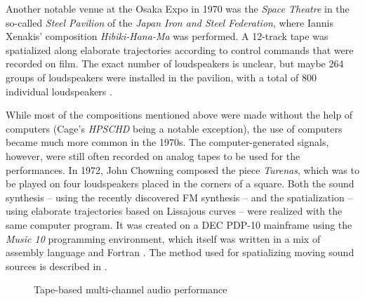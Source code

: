 Another notable venue at the Osaka Expo in 1970 was the
\emph{Space Theatre}
in the
so-called \emph{Steel Pavilion} of the \emph{Japan Iron and Steel Federation},
where
Iannis Xenakis' composition \emph{Hibiki-Hana-Ma} was performed.
A 12-track tape was spatialized along elaborate trajectories
according to control commands
that were recorded on film.
The exact number of loudspeakers is unclear,
but maybe 264 groups of loudspeakers were installed in the pavilion,
with a total of 800 individual loudspeakers
\parencite{paland2015xenakis}.

While most of the compositions mentioned above were made
without the help of computers (Cage's \emph{HPSCHD} being a notable exception),
the use of computers became much more common in the 1970s.
The computer-generated signals, however,
were still often recorded on analog tapes to be used for the performances.
In 1972,
John Chowning composed the piece \emph{Turenas},
which was to be played on
four loudspeakers placed in the corners of a square.
Both the sound synthesis
-- using the recently discovered FM synthesis --
and the spatialization
-- using elaborate trajectories based on Lissajous curves --
were realized with the same computer program.
It was created on a DEC PDP-10 mainframe
using the \emph{Music 10} programming environment,
which itself was written in a mix of assembly language and Fortran
\parencite{chowning2011turenas}.
The method used for spatializing moving sound sources is described in
\parencite{chowning1971moving}.


\begin{figure}[htbp]
\centering
{}
\caption{Tape-based multi-channel audio performance}
\label{fig:tape-mixing}
\end{figure}

